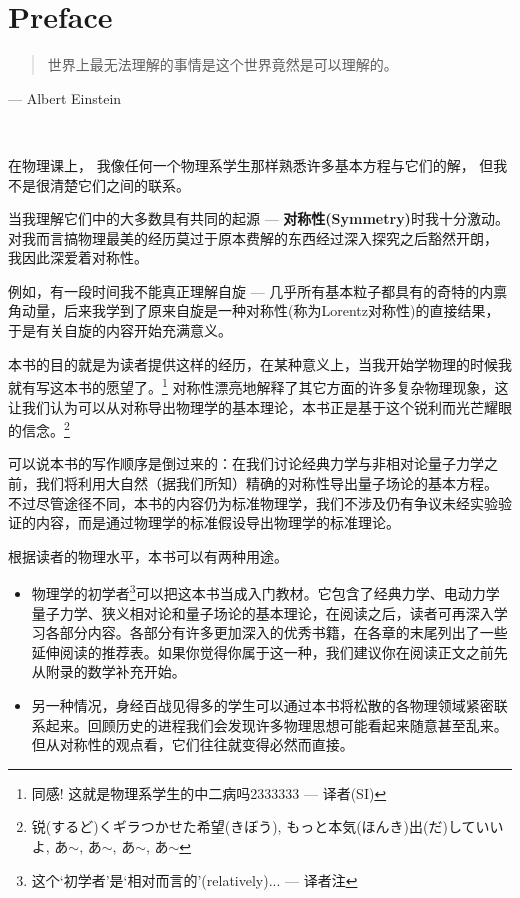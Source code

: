 
\chapter*{Preface}

\begin{quote}
世界上最无法理解的事情是这个世界竟然是可以理解的。
\end{quote}
--- Albert Einstein

\ 

在物理课上， 我像任何一个物理系学生那样熟悉许多基本方程与它们的解， 但我不是很清楚它们之间的联系。

当我理解它们中的大多数具有共同的起源 --- \textbf{对称性(Symmetry)}时我十分激动。 对我而言搞物理最美的经历莫过于原本费解的东西经过深入探究之后豁然开朗， 我因此深爱着对称性。

例如，有一段时间我不能真正理解自旋 --- 几乎所有基本粒子都具有的奇特的内禀角动量，后来我学到了原来自旋是一种对称性(称为Lorentz对称性)的直接结果，于是有关自旋的内容开始充满意义。

本书的目的就是为读者提供这样的经历，在某种意义上，当我开始学物理的时候我就有写这本书的愿望了。\footnote{同感! 这就是物理系学生的中二病吗2333333 --- 译者(SI)} 对称性漂亮地解释了其它方面的许多复杂物理现象，这让我们认为可以从对称导出物理学的基本理论，本书正是基于这个锐利而光芒耀眼的信念。\footnote{锐(するど)くギラつかせた希望(きぼう), もっと本気(ほんき)出(だ)していいよ, あ$\sim$, あ$\sim$, あ$\sim$, あ$\sim$}

可以说本书的写作顺序是倒过来的：在我们讨论经典力学与非相对论量子力学之前，我们将利用大自然（据我们所知）精确的对称性导出量子场论的基本方程。 不过尽管途径不同，本书的内容仍为标准物理学，我们不涉及仍有争议未经实验验证的内容，而是通过物理学的标准假设导出物理学的标准理论。

根据读者的物理水平，本书可以有两种用途。
\begin{itemize}
	\item 物理学的初学者\footnote{这个`初学者'是`相对而言的'(relatively)... --- 译者注}可以把这本书当成入门教材。它包含了经典力学、电动力学量子力学、狭义相对论和量子场论的基本理论，在阅读之后，读者可再深入学习各部分内容。各部分有许多更加深入的优秀书籍，在各章的末尾列出了一些延伸阅读的推荐表。如果你觉得你属于这一种，我们建议你在阅读正文之前先从附录的数学补充开始。
	\item 
	另一种情况，身经百战见得多的学生可以通过本书将松散的各物理领域紧密联系起来。回顾历史的进程我们会发现许多物理思想可能看起来随意甚至乱来。但从对称性的观点看，它们往往就变得必然而直接。
\end{itemize}

